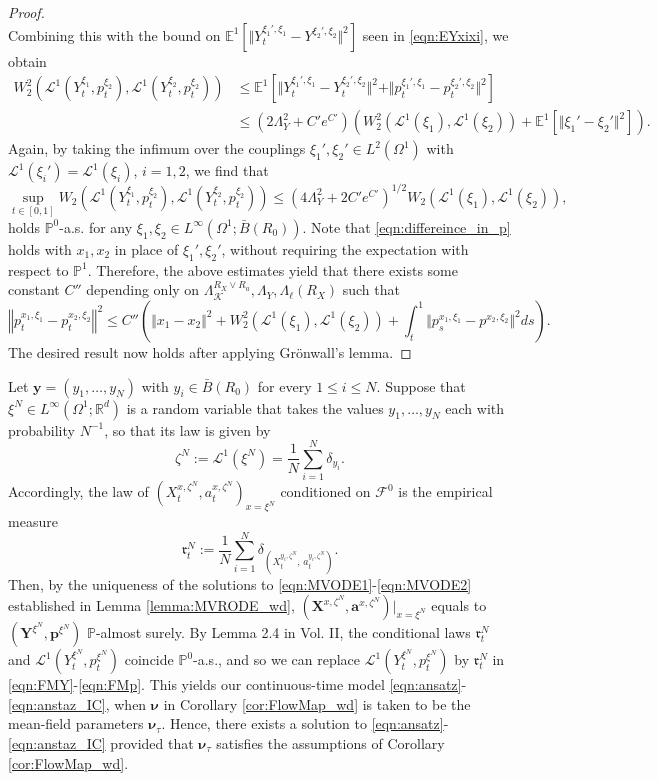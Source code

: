 \documentclass{article}
\newcommand{\R}{\mathbb{R}}
\newcommand{\E}{\mathbb{E}}
\begin{document}
\begin{appendices}
\begin{proof}
\[\]
Combining this with the bound on $\E^1\left[\Vert Y^{\xi_1',\xi_1}_t-Y^{\xi_2',\xi_2}\Vert^2\right] $ seen in \eqref{eqn:EYxixi}, we obtain
\begin{align*}
   W_2^2\left(\mathcal L^1(Y^{\xi_1}_t,p^{\xi_2}_t), \mathcal L^1(Y^{\xi_2}_t,p^{\xi_2}_t) \right)&\le  \E^1\left[ \Vert Y^{\xi_1',\xi_1}_t-Y^{\xi_2',\xi_2}_t \Vert^2 +\Vert p^{\xi_1',\xi_1}_t-p^{\xi_2',\xi_2}_t \Vert^2 \right] \\& \le (2\Lambda_Y^2+C'e^{C'})\left(W_2^2(\mathcal L^1(\xi_1),\mathcal L^1(\xi_2))+ \E^1\left[\Vert \xi_1'-\xi_2'\Vert^2\right] \right).
\end{align*} Again, by taking the infimum over the couplings $\xi_1',\xi_2'\in L^2(\Omega^1)$ with $\mathcal L^1(\xi_i')=\mathcal L^1(\xi_i)$, $i=1,2$, we find that 
\[
\sup_{t\in[0,1]}W_2\left(\mathcal L^1(Y^{\xi_1}_t,p^{\xi_2}_t), \mathcal L^1(Y^{\xi_2}_t,p^{\xi_2}_t) \right)\le (4\Lambda_Y^2+2C'e^{C'})^{1/2}W_2(\mathcal L^1(\xi_1),\mathcal L^1(\xi_2)),
\]
holds $\mathbb P^0$-a.s. for any $\xi_1,\xi_2\in L^\infty(\Omega^1;\bar B(R_0))$. Note that \eqref{eqn:differeince_in_p} holds with $x_1,x_2$ in place of $\xi_1',\xi_2'$, without requiring the expectation with respect to $\mathbb P^1$. Therefore, the above estimates yield that there exists some constant $C''$  depending only on $\Lambda^{R_X\vee R_a}_{\mathcal K},\Lambda_Y,\Lambda_\ell(R_X)$ such that
\[
\left\Vert p^{x_1,\xi_1}_t-p^{x_2,\xi_2}_t\right\Vert^2\le C'' \left( \Vert x_1-x_2\Vert^2+ W^2_2(\mathcal L^1(\xi_1),\mathcal L^1(\xi_2))+\int_t^1\Vert p^{x_1,\xi_1}_s-p^{x_2,\xi_2}\Vert^2ds\right).
\]
The desired result now holds after applying Gr\"onwall's lemma.
\end{proof}
Let $\bm{y}=(y_1,\ldots,y_N)$ with  $y_i\in \bar B(R_0)$ for every $1\le i \le N$.
Suppose that $\xi^N\in L^\infty(\Omega^1;\R^d)$ is a random variable that takes the values $y_1,\ldots, y_N$ each with probability $N^{-1}$, so that its law is given by
\[
\zeta^N:=\mathcal L^1(\xi^N) = \frac{1}{N}\sum_{i=1}^N\delta_{y_i}.
\]
Accordingly, the law of $(X^{x,\zeta^N}_t,a^{x,\zeta^N}_t)_{x=\xi^N}$ conditioned on $\mathcal F^0$ is the empirical measure
\[
\mathfrak{r}^N_t:= \frac{1}{N}\sum_{i=1}^N \delta_{\left(X^{y_i,\zeta^N}_t,\,a^{y_i,\zeta^N}_t\right)}.\]
Then, by the uniqueness of the solutions to \eqref{eqn:MVODE1}-\eqref{eqn:MVODE2} established in Lemma \ref{lemma:MVRODE_wd}, $(\bm X^{x,\zeta^N},\bm a^{x,\zeta^N})|_{x=\xi^N}$ equals to $(\bm Y^{\xi^N},\bm p^{\xi^N})$ $\mathbb P$-almost surely. By Lemma 2.4 in \cite{carmona2018probabilistic} Vol. II, the conditional laws $\mathfrak{r}^N_t$ and $\mathcal L^1(Y^{\xi^N}_t,p^{\xi^N}_t)$
 coincide  $\mathbb P^0$-a.s., and so we can replace $\mathcal L^1(Y^{\xi^N}_t,p^{\xi^N}_t)$ by $\mathfrak{r}^N_t$ in \eqref{eqn:FMY}-\eqref{eqn:FMp}. This yields our continuous-time model \eqref{eqn:ansatz}-\eqref{eqn:anstaz_IC}, when $\bm\nu$ in Corollary \eqref{cor:FlowMap_wd} is taken to be the mean-field parameters $\bm\nu_\tau$. Hence, there exists a solution to \eqref{eqn:ansatz}-\eqref{eqn:anstaz_IC} provided that $\bm\nu_\tau$ satisfies the assumptions of Corollary \eqref{cor:FlowMap_wd}.



\end{appendices}
\end{document}
